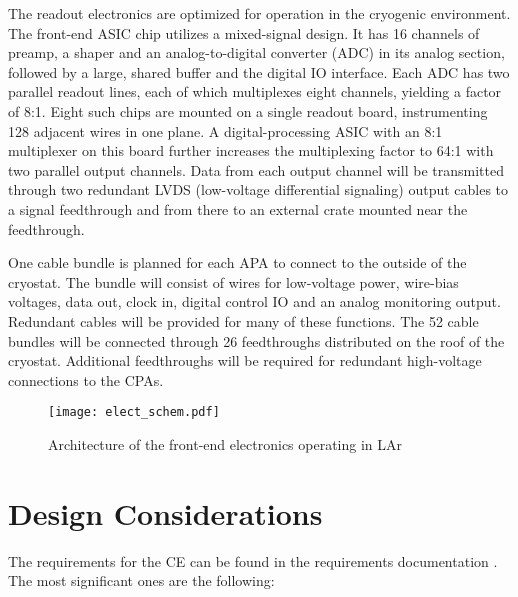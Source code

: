 The readout electronics are optimized for operation in the cryogenic environment.  
The front-end ASIC chip utilizes a mixed-signal design.  
It has 16 channels of preamp, a shaper and an analog-to-digital converter (ADC) in its analog section,  
followed by a large, shared buffer and the digital IO interface.
Each ADC has two parallel readout lines, each of which multiplexes eight channels, yielding a factor of 8:1.
Eight such chips 
are mounted on a single readout board, instrumenting 128 adjacent wires in one plane. 
A digital-processing ASIC with an 8:1 multiplexer on this board further 
increases the multiplexing factor to 64:1 with two parallel output channels.
Data from each output channel will be transmitted through two redundant LVDS (low-voltage differential signaling)
output cables to a signal feedthrough and from there to an external crate mounted near the feedthrough.

One cable bundle is planned for each APA to connect to the outside of the cryostat.
The bundle will consist of wires for low-voltage power, wire-bias voltages, data out, clock in,
digital control IO and an analog monitoring output.
Redundant cables will be provided for many of these functions.
The 52 cable bundles will be connected through 26 feedthroughs distributed on the roof of the cryostat.
Additional feedthroughs will be required for redundant high-voltage connections to the CPAs. 
 
\begin{figure}[htbp]
\centering
\texttt{[image: elect\_schem.pdf]}
\caption{Architecture of the front-end electronics operating in LAr}
\label{fig:ce-elec-schematic}
\end{figure}


\section{Design Considerations} 
\label{sec:ce-reqs-n-specs}

The requirements for the CE can be found in the requirements documentation \cite{lar-fd-req}.
The most significant ones are the following:

